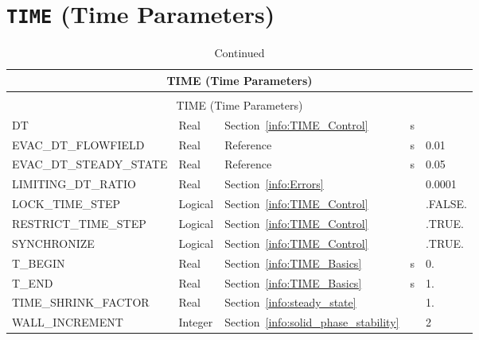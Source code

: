 \documentclass[11pt]{book}
\begin{document}
\vspace{\baselineskip}


\section{\texorpdfstring{{\tt TIME}}{TIME} (Time Parameters)}

\begin{longtable}{@{\extracolsep{\fill}}|l|l|l|l|l|}
\caption[Time parameters ({\ct TIME} namelist group)]{For more information see Section~\ref{info:TIME}.}
\label{tbl:TIME} \\
\hline
\multicolumn{5}{|c|}{{\ct TIME} (Time Parameters)} \\
\hline \hline
\endfirsthead
\caption[]{Continued} \\
\hline
\multicolumn{5}{|c|}{{\ct TIME} (Time Parameters)} \\
\hline \hline
\endhead
{\ct DT}                        & Real       & Section~\ref{info:TIME_Control}           & s           &                 \\ \hline
{\ct EVAC\_DT\_FLOWFIELD}       & Real       & Reference~\cite{FDS_Evac_Users_Guide}     & s           &  0.01           \\ \hline
{\ct EVAC\_DT\_STEADY\_STATE}   & Real       & Reference~\cite{FDS_Evac_Users_Guide}     & s           &  0.05           \\ \hline
{\ct LIMITING\_DT\_RATIO}       & Real       & Section~\ref{info:Errors}                 &               &  0.0001         \\ \hline
{\ct LOCK\_TIME\_STEP}          & Logical    & Section~\ref{info:TIME_Control}           &             & {\ct .FALSE.}   \\ \hline
{\ct RESTRICT\_TIME\_STEP}      & Logical    & Section~\ref{info:TIME_Control}           &             & {\ct .TRUE.}    \\ \hline
{\ct SYNCHRONIZE}               & Logical    & Section~\ref{info:TIME_Control}           &             & {\ct .TRUE.}    \\ \hline
{\ct T\_BEGIN}                  & Real       & Section~\ref{info:TIME_Basics}            & s           & 0.              \\ \hline
{\ct T\_END}                    & Real       & Section~\ref{info:TIME_Basics}            & s           & 1.              \\ \hline
{\ct TIME\_SHRINK\_FACTOR}      & Real       & Section~\ref{info:steady_state}           &             & 1.              \\ \hline
{\ct WALL\_INCREMENT}           & Integer    & Section~\ref{info:solid_phase_stability}  &             & 2               \\ \hline
\end{longtable}
\end{document}

